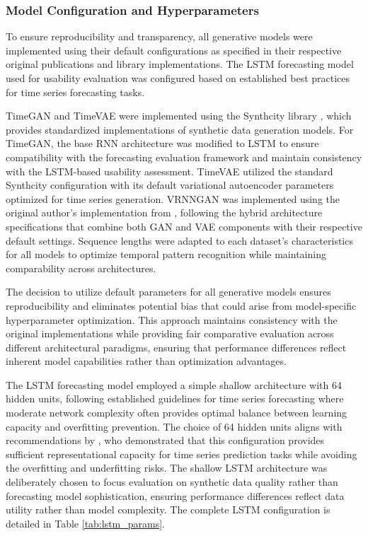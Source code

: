 \documentclass[11pt]{article}
\begin{document}
\subsubsection{Model Configuration and Hyperparameters}

To ensure reproducibility and transparency, all generative models were implemented using their default configurations as specified in their respective original publications and library implementations. The LSTM forecasting model used for usability evaluation was configured based on established best practices for time series forecasting tasks.

TimeGAN and TimeVAE were implemented using the Synthcity library \parencite{Qian2023-pa}, which provides standardized implementations of synthetic data generation models. For TimeGAN, the base RNN architecture was modified to LSTM to ensure compatibility with the forecasting evaluation framework and maintain consistency with the LSTM-based usability assessment. TimeVAE utilized the standard Synthcity configuration with its default variational autoencoder parameters optimized for time series generation. VRNNGAN was implemented using the original author's implementation from \textcite{lee_vrnngan_2022}, following the hybrid architecture specifications that combine both GAN and VAE components with their respective default settings. Sequence lengths were adapted to each dataset's characteristics for all models to optimize temporal pattern recognition while maintaining comparability across architectures.

The decision to utilize default parameters for all generative models ensures reproducibility and eliminates potential bias that could arise from model-specific hyperparameter optimization. This approach maintains consistency with the original implementations while providing fair comparative evaluation across different architectural paradigms, ensuring that performance differences reflect inherent model capabilities rather than optimization advantages.

The LSTM forecasting model employed a simple shallow architecture with 64 hidden units, following established guidelines for time series forecasting where moderate network complexity often provides optimal balance between learning capacity and overfitting prevention. The choice of 64 hidden units aligns with recommendations by \textcite{Prihatno2021-mi}, who demonstrated that this configuration provides sufficient representational capacity for time series prediction tasks while avoiding the overfitting and underfitting risks. The shallow LSTM architecture was deliberately chosen to focus evaluation on synthetic data quality rather than forecasting model sophistication, ensuring performance differences reflect data utility rather than model complexity. The complete LSTM configuration is detailed in Table \ref{tab:lstm_params}.
\end{document}
